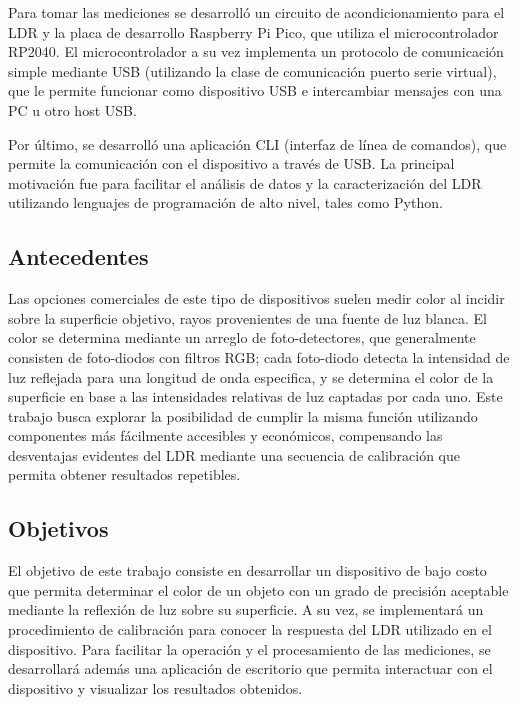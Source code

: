 \documentclass[12pt,a4paper,fleqn]{article}
\begin{document}
Para tomar las mediciones se desarrolló un circuito de acondicionamiento para el LDR y la placa de desarrollo Raspberry Pi Pico, que utiliza el microcontrolador RP2040. El microcontrolador a su vez implementa un protocolo de comunicación simple mediante USB (utilizando la clase de comunicación puerto serie virtual), que le permite funcionar como dispositivo USB e intercambiar mensajes con una PC u otro host USB\@.

Por último, se desarrolló una aplicación CLI (interfaz de línea de comandos), que permite la comunicación con el dispositivo a través de USB\@. La principal motivación fue para facilitar el análisis de datos y la caracterización del LDR utilizando lenguajes de programación de alto nivel, tales como Python.

\subsection{Antecedentes}

Las opciones comerciales de este tipo de dispositivos suelen medir color al incidir sobre la superficie objetivo, rayos provenientes de una fuente de luz blanca. El color se determina mediante un arreglo de foto-detectores, que generalmente consisten de foto-diodos con filtros RGB; cada foto-diodo detecta la intensidad de luz reflejada para una longitud de onda especifica, y se determina el color de la superficie en base a las intensidades relativas de luz captadas por cada uno. Este trabajo busca explorar la posibilidad de cumplir la misma función utilizando componentes más fácilmente accesibles y económicos, compensando las desventajas evidentes del LDR mediante una secuencia de calibración que permita obtener resultados repetibles.

\subsection{Objetivos}

El objetivo de este trabajo consiste en desarrollar un dispositivo de bajo costo que permita determinar el color de un objeto con un grado de precisión aceptable mediante la reflexión de luz sobre su superficie. A su vez, se implementará un procedimiento de calibración para conocer la respuesta del LDR utilizado en el dispositivo. Para facilitar la operación y el procesamiento de las mediciones, se desarrollará además una aplicación de escritorio que permita interactuar con el dispositivo y visualizar los resultados obtenidos.
\end{document}
